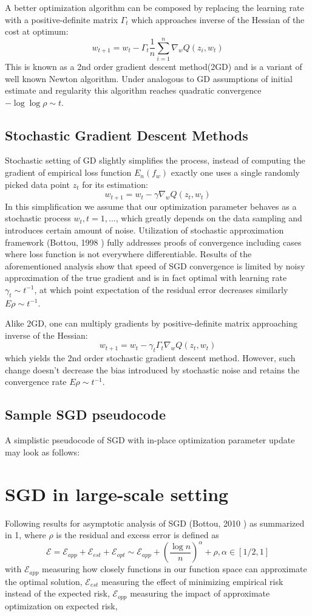 A better optimization algorithm can be composed by replacing the learning rate with a positive-definite matrix $\Gamma_t$ which approaches inverse of the Hessian of the cost at optimum:
$$w_{t+1}=w_t-\Gamma_t \frac{1}{n} \sum\limits_{i=1}^{n} \nabla_w Q(z_i, w_t)$$
This is known as a 2nd order gradient descent method(2GD) and is a variant of well known Newton algorithm. Under analogous to GD assumptions of initial estimate and regularity this algorithm reaches quadratic convergence $-\log\log\rho \sim t$.

\subsection{Stochastic Gradient Descent Methods}
Stochastic setting of GD slightly simplifies the process, instead of computing the gradient of empirical loss function $E_n(f_w)$ exactly one uses a single randomly picked data point $z_t$ for its estimation:
$$w_{t+1}=w_t-\gamma \nabla_w Q(z_t, w_t)$$
In this simplification we assume that our optimization parameter behaves as a stochastic process ${w_t, t=1,...}$, which greatly depends on the data sampling and introduces certain amount of noise. Utilization of stochastic approximation framework (Bottou, 1998 \cite{bottou-98x}) fully addresses proofs of convergence including cases where loss function is not everywhere differentiable. Results of the aforementioned analysis show that speed of SGD convergence is limited by noisy approximation of the true gradient and is in fact optimal with learning rate $\gamma_t \sim t^{-1}$, at which point expectation of the residual error decreases similarly $E\rho \sim t^{-1}$.

Alike 2GD, one can multiply gradients by positive-definite matrix approaching inverse of the Hessian:
$$w_{t+1}=w_t-\gamma_t\Gamma_t \nabla_w Q(z_t, w_t)$$
which yields the 2nd order stochastic gradient descent method. However, such change doesn't decrease the bias introduced by stochastic noise and retains the convergence rate $E\rho \sim t^{-1}$.

\subsection{Sample SGD pseudocode}
A simplistic pseudocode of SGD with in-place optimization parameter update may look as follows:


\section{SGD in large-scale setting}
Following results for asymptotic analysis of SGD (Bottou, 2010 \cite{bottou-2010}) as summarized in \figurename{1}, where $\rho$ is the residual and excess error is defined as 
$$\mathcal{E} = \mathcal{E}_{app} + \mathcal{E}_{est} + \mathcal{E}_{opt} \sim \mathcal{E}_{app} + (\frac{\log n}{n})^\alpha + \rho, \alpha \in [1/2, 1]$$
with $\mathcal{E}_{app}$ measuring how closely functions in our function space can approximate the optimal solution, $\mathcal{E}_{est}$ measuring the effect of minimizing empirical risk instead of the expected risk, $\mathcal{E}_{opp}$ measuring the impact of approximate optimization on expected risk,

